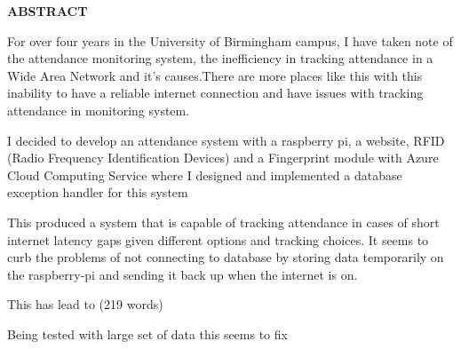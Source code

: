 \providecommand\phantomsection{} \phantomsection
\begin{center}
\providecommand\pdfbookmark[3][]{} \pdfbookmark[0]{Abstract}{bm:Abstract}
\vspace*{1in}
\textbf{ABSTRACT}\\[2\baselineskip]
\end{center}

For over four years in the University of Birmingham campus, I  have taken note of the attendance monitoring system, the inefficiency in tracking attendance  in a Wide Area Network and it's causes.There are more places like this with this inability to have a reliable internet connection and have issues with tracking attendance in monitoring system.


I decided to develop an attendance system with a raspberry pi, a website, RFID (Radio Frequency Identification Devices) and a Fingerprint module with Azure Cloud Computing Service where I designed and implemented a database exception handler for this system 

This produced a system that is capable of tracking attendance in cases of short internet latency gaps given different options and tracking choices. It seems to curb the problems of not connecting to database by storing data temporarily on the raspberry-pi and sending it back up when the internet is on.



This has lead to (219 words)

Being tested with large set of data this seems to fix 

